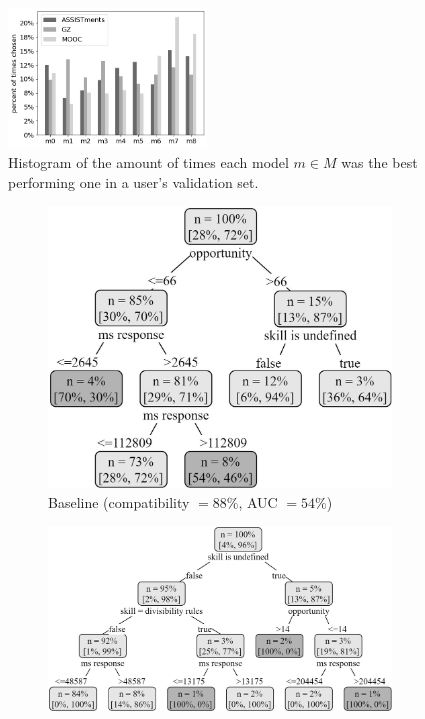 \documentclass[letterpaper]{article}
\theoremstyle{definition}
\begin{document}
\begin{figure}
\centering
\includegraphics[width=0.47\textwidth]{model_counts}
\caption{Histogram of the amount of times each model $m\in M$ was the best performing one in a user's validation set.}
\label{fig:model_counts}
\end{figure}

\begin{figure}[t]
\begin{subfigure}[b]{.4\textwidth}
\centering
\includegraphics[width=0.95\linewidth]{assistments_baseline}
\caption{Baseline (compatibility $=88\%$, AUC $=54\%$)}
\label{fig:assistments_baseline}
\end{subfigure}
\begin{subfigure}[b]{.6\textwidth}
\centering
\includegraphics[width=0.95\linewidth]{assistments_personalized}

\end{subfigure}
\end{figure}
\end{document}
